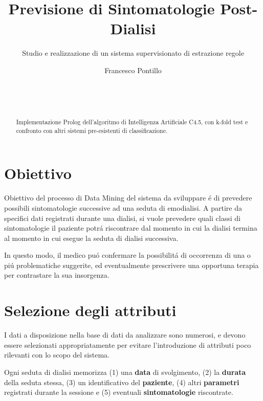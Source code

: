 \documentclass[preprint]{acm_proc_article-sp}
\begin{document}
\title{Previsione di Sintomatologie Post-Dialisi}
\subtitle{Studio e realizzazione di un sistema supervisionato di estrazione regole}

\author{
	\alignauthor
	Francesco Pontillo\\
       \\
       \\
       \\
}

\maketitle

\begin{abstract}
Implementazione Prolog dell'algoritmo di Intelligenza Artificiale C4.5, con k-fold test e confronto con altri sistemi pre-esistenti di classificazione.
\end{abstract}

\section{Obiettivo}
Obiettivo del processo di Data Mining del sistema da sviluppare \'e di prevedere possibili sintomatologie successive ad una seduta di emodialisi.
A partire da specifici dati registrati durante una dialisi, si vuole prevedere quali classi di sintomatologie il paziente potr\'a riscontrare dal momento in cui la dialisi termina al momento in cui esegue la seduta di dialisi successiva.

In questo modo, il medico pu\'o confermare la possibilit\'a di occorrenza di una o pi\'u problematiche suggerite, ed eventualmente prescrivere una opportuna terapia per contrastare la sua insorgenza.

\section{Selezione degli attributi}
I dati a disposizione nella base di dati da analizzare sono numerosi, e devono essere selezionati appropriatamente per evitare l'introduzione di attributi poco rilevanti con lo scopo del sistema.

Ogni seduta di dialisi memorizza (1) una \textbf{data} di svolgimento, (2) la \textbf{durata} della seduta stessa, (3) un identificativo del \textbf{paziente}, (4) altri \textbf{parametri} registrati durante la sessione e (5) eventuali \textbf{sintomatologie} riscontrate.
\end{document}
